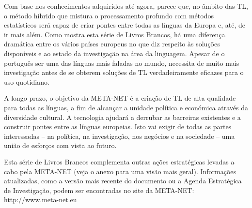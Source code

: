 \begin{multicols}{2}

Com base nos conhecimentos adquiridos até agora, parece que, no âmbito das TL, o método híbrido que mistura o processamento profundo com métodos estatísticos será capaz de criar pontes entre todas as línguas da Europa e, até, de ir mais além. Como mostra esta série de Livros Brancos, há uma di\-fe\-ren\-ça dramática entre os vários países europeus no que diz respeito às soluções disponíveis e ao estado da investigação na área da linguagem. Apesar de o português ser uma das línguas mais faladas no mundo, necessita de muito mais investigação antes de se obterem soluções de TL verdadeiramente eficazes para o uso quotidiano.

A longo prazo, o objetivo da META-NET é a criação de TL de alta qualidade para todas as línguas, a fim de alcançar a unidade política e económica através da diversidade cultural. A tecnologia ajudará a derrubar as barreiras existentes e a construir pontes entre as línguas europeias. Isto vai exigir de todas as partes interessadas – na política, na investigação, nos negócios e na sociedade – uma união de esforços com vista ao futuro.

Esta série de Livros Brancos complementa outras ações estratégicas levadas a cabo pela META-NET (veja o anexo para uma visão mais geral). Informações atualizadas, como a versão mais recente do documento\cite{Meta1}  ou a Agenda Estratégica de Investigação, podem ser encontradas no site da META-NET: http://www.meta-net.eu
\end{multicols}

\clearpage



